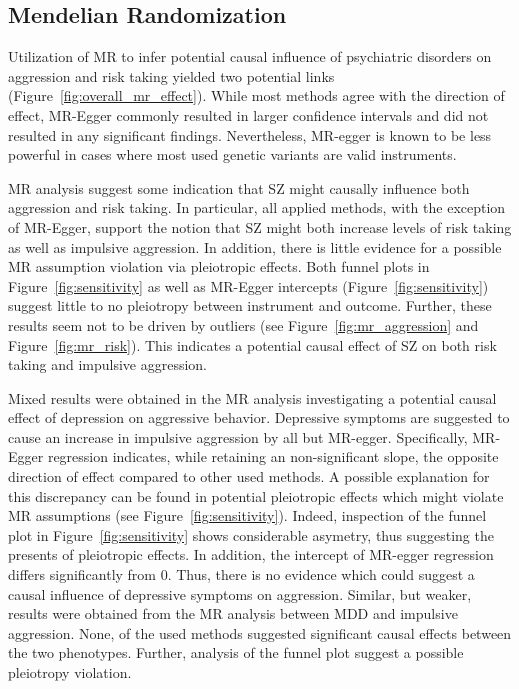 \subsection{Mendelian Randomization}
\label{sub:mendelian_randomization}

Utilization of MR to infer potential causal influence of psychiatric disorders on aggression and risk taking yielded two potential links (Figure~\ref{fig:overall_mr_effect}).
While most methods agree with the direction of effect, MR-Egger commonly resulted in larger confidence intervals and did not resulted in any significant findings.
Nevertheless, MR-egger is known to be less powerful in cases where most used genetic variants are valid instruments.

MR analysis suggest some indication that SZ might causally influence both aggression and risk taking.
In particular, all applied methods, with the exception of MR-Egger, support the notion that SZ might both increase levels of risk taking as well as impulsive aggression.
In addition, there is little evidence for a possible MR assumption violation via pleiotropic effects.
Both funnel plots in Figure~\ref{fig:sensitivity} as well as MR-Egger intercepts (Figure~\ref{fig:sensitivity}) suggest little to no pleiotropy between instrument and outcome.
Further, these results seem not to be driven by outliers (see Figure~\ref{fig:mr_aggression} and Figure~\ref{fig:mr_risk}).
This indicates a potential causal effect of SZ on both risk taking and impulsive aggression.

Mixed results were obtained in the MR analysis investigating a potential causal effect of depression on aggressive behavior.
Depressive symptoms are suggested to cause an increase in impulsive aggression by all but MR-egger.
Specifically, MR-Egger regression indicates, while retaining an non-significant slope, the opposite direction of effect compared to other used methods.  
A possible explanation for this discrepancy can be found in potential pleiotropic effects which might violate MR assumptions (see Figure~\ref{fig:sensitivity}).
Indeed, inspection of the funnel plot in Figure~\ref{fig:sensitivity} shows considerable asymetry, thus suggesting the presents of pleiotropic effects.
In addition, the intercept of MR-egger regression differs significantly from $0$.
Thus, there is no evidence which could suggest a causal influence of depressive symptoms on aggression. 
Similar, but weaker, results were obtained from the MR analysis between MDD and impulsive aggression.
None, of the used methods suggested significant causal effects between the two phenotypes. 
Further, analysis of the funnel plot suggest a possible pleiotropy violation.

